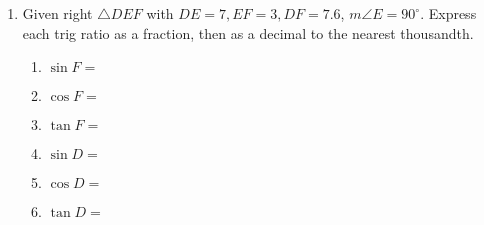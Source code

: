 \begin{enumerate}
\item Given right $\triangle DEF$ with $DE=7, EF=3, DF=7.6$, $m\angle E=90^\circ$. Express each trig ratio as a fraction, then as a decimal to the nearest thousandth.
  \begin{center}
     \vspace{1cm}
  \end{center}
  \begin{multicols}{2}
    \begin{enumerate}
      \item $\sin F = $ \vspace{1cm}
      \item $\cos F =$ \vspace{1cm}
      \item $\tan F =$
      \item $\sin D = $ \vspace{1cm}
      \item $\cos D =$ \vspace{1cm}
      \item $\tan D =$

    \end{enumerate}
  \end{multicols}

\newpage

\end{enumerate}
